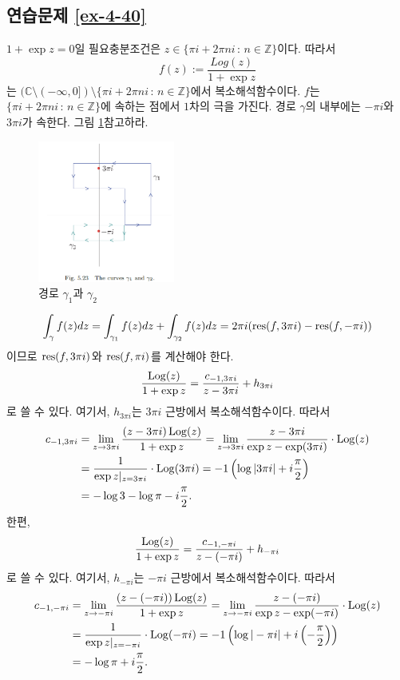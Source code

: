 \subsection*{연습문제 \ref{ex-4-40}}

$1+\exp z =0$일 필요충분조건은 $ z\in \{ \pi i +2\pi n i \,:\, n\in \mathbb Z\}$이다.
따라서
\[
f(z):= \dfrac{Log(z)}{1+\exp z}
\]
는 $(\mathbb C\setminus(-\infty,0])\setminus \{ \pi i +2\pi n i \,:\, n\in \mathbb Z\}$에서
복소해석함수이다.
$f$는 $\{ \pi i +2\pi n i \,:\, n\in \mathbb Z\}$에 속하는 점에서 $1$차의 극을 가진다.
경로 $\gamma$의 내부에는 $-\pi i$와  $3\pi i$가 속한다. 그림 \ref{fig-5-23}\을 참고하라.

\begin{figure}[h!]
\begin{center}
\includegraphics[width=0.4\textwidth]{./Solution/figs/fig-5-23}
\end{center}
\caption{경로 $\gamma_1$과 $\gamma_2$
}
\label{fig-5-23}
\end{figure}

\[
\int_\gamma f(z) dz = \int_{\gamma_1} f(z) dz + \int_{\gamma_2} f(z) dz
= 2\pi i (\mathop{\mathrm{res}}(f,3\pi i) - \mathop{\mathrm{res}}(f, -\pi i))
\]
이므로 $\mathop{\mathrm{res}}(f, 3\pi i)$와 $\mathop{\mathrm{res}}(f, \pi i)$를 계산해야 한다.
\[
\displaystyle\frac{\mathop{\mathrm{Log}}(z)}{1+\exp z} = \displaystyle\frac{c_{-1,3\pi i}}{z-3\pi i} + h_{3\pi i}
\]
로 쓸 수 있다. 여기서, $h_{3\pi i}$는 $3\pi i$ 근방에서 복소해석함수이다.
따라서
\begin{align*}
c_{-1,3\pi i}
&= \lim_{z\to 3\pi i} \displaystyle\frac{(z-3\pi i)\mathop{\mathrm{Log}}(z)}{1+\exp z} 
= \lim_{z\to 3\pi i} \displaystyle\frac{z-3\pi i}{\exp z - \exp(3\pi i)}\cdot \mathop{\mathrm{Log}}(z) \\
&= \displaystyle\frac1{\exp z|_{z=3\pi i}} \cdot \mathop{\mathrm{Log}}(3\pi i) = -1\left( \log|3\pi i| + i\displaystyle\frac\pi2 \right) \\
&= - \log 3 - \log\pi- i\displaystyle\frac\pi2.
\end{align*}
한편,
\[
\displaystyle\frac{\mathop{\mathrm{Log}}(z)}{1+\exp z} = \displaystyle\frac{c_{-1,-\pi i}}{z-(-\pi i)} + h_{-\pi i}
\]
로 쓸 수 있다. 여기서, $h_{-\pi i}$는 $-\pi i$ 근방에서 복소해석함수이다.
따라서
\begin{align*}
c_{-1,-\pi i}
&= \lim_{z\to -\pi i} \displaystyle\frac{(z-(-\pi i))\mathop{\mathrm{Log}}(z)}{1+\exp z} 
= \lim_{z\to -\pi i} \displaystyle\frac{z-(-\pi i)}{\exp z - \exp(-\pi i)}\cdot \mathop{\mathrm{Log}}(z) \\
&= \displaystyle\frac1{\exp z|_{z=-\pi i}} \cdot \mathop{\mathrm{Log}}(-\pi i) 
= -1\left( \log|-\pi i| + i\left(-\displaystyle\frac\pi2 \right)\right) \\
&= - \log\pi +  i\displaystyle\frac\pi2.
\end{align*}

